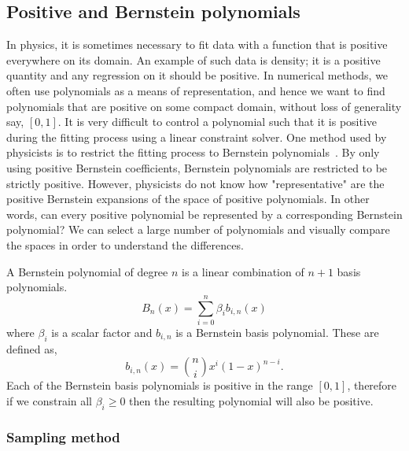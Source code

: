 \subsection{Positive and Bernstein polynomials}
\label{sec:bernstein}

In physics, it is sometimes necessary to fit data with a function that is
positive everywhere on its domain.  An example of such data is density; it
is a positive quantity and any regression on it should be positive.  In
numerical methods, we often use polynomials as a means of representation, and
hence we want to find polynomials that are positive on some compact domain,
without loss of generality say, $[0,1]$.
It is very difficult to control a polynomial
such that it is positive during the fitting process using a linear constraint
solver. One method used by physicists is to restrict the
fitting process to Bernstein polynomials~\cite{Phillips:2003}. By only using 
positive Bernstein coefficients, Bernstein
polynomials are restricted to be strictly positive.  However,
physicists do not know how "representative" are the positive Bernstein
expansions of the space of positive polynomials. In other words, can every
positive polynomial be represented by a corresponding Bernstein polynomial? We
can select a large number of polynomials and visually compare the spaces in
order to understand the differences.

A Bernstein polynomial of degree \(n\) is a linear combination of
\(n+1\) basis polynomials. 
\[
B_n(x) = \sum_{i=0}^n \beta_i b_{i,n}(x) 
\]
where \(\beta_i\) is a scalar factor and
\(b_{i,n}\) is a Bernstein basis polynomial. These are defined as, 
\[
b_{i,n}(x) = {n \choose i} x^i (1-x)^{n-i}.
\] Each of the
Bernstein basis polynomials is positive in the range \([0,1]\), therefore
if we constrain all \(\beta_i \ge 0\) then the resulting polynomial will
also be positive.

\subsubsection{Sampling method}


